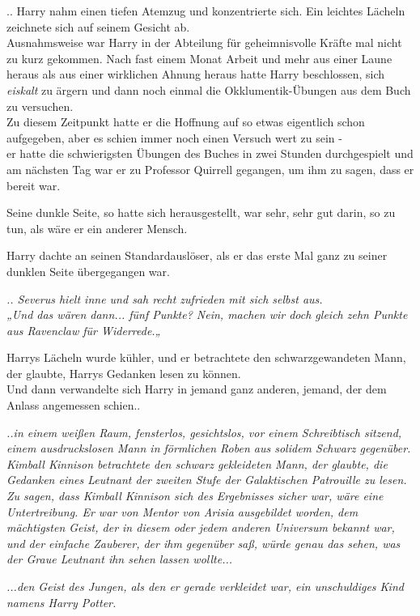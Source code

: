{.. Harry nahm einen tiefen Atemzug und konzentrierte sich. Ein leichtes Lächeln zeichnete sich auf seinem Gesicht ab.\\ Ausnahmsweise war Harry in der Abteilung für geheimnisvolle Kräfte mal nicht zu kurz gekommen. Nach fast einem Monat Arbeit und mehr aus einer Laune heraus als aus einer wirklichen Ahnung heraus hatte Harry beschlossen, sich \emph{eiskalt} zu ärgern und dann noch einmal die Okklumentik-Übungen aus dem Buch zu versuchen.\\ Zu diesem Zeitpunkt hatte er die Hoffnung auf so etwas eigentlich schon aufgegeben, aber es schien immer noch einen Versuch wert zu sein -\\ er hatte die schwierigsten Übungen des Buches in zwei Stunden durchgespielt und am nächsten Tag war er zu Professor Quirrell gegangen, um ihm zu sagen, dass er bereit war.

Seine dunkle Seite, so hatte sich herausgestellt, war sehr, sehr gut darin, so zu tun, als wäre er ein anderer Mensch.

Harry dachte an seinen Standardauslöser, als er das erste Mal ganz zu seiner dunklen Seite übergegangen war.

\emph{.. Severus hielt inne und sah recht zufrieden mit sich selbst aus.\\ „Und das wären dann... fünf Punkte? Nein, machen wir doch gleich zehn Punkte aus Ravenclaw für Widerrede.„}

Harrys Lächeln wurde kühler, und er betrachtete den schwarzgewandeten Mann, der glaubte, Harrys Gedanken lesen zu können.\\ Und dann verwandelte sich Harry in jemand ganz anderen, jemand, der dem Anlass angemessen schien..

\emph{..in einem weißen Raum, fensterlos, gesichtslos, vor einem Schreibtisch sitzend, einem ausdruckslosen Mann in förmlichen Roben aus solidem Schwarz gegenüber.\\ Kimball Kinnison betrachtete den schwarz gekleideten Mann, der glaubte, die Gedanken eines Leutnant der zweiten Stufe der Galaktischen Patrouille zu lesen.\\ Zu sagen, dass Kimball Kinnison sich des Ergebnisses sicher war, wäre eine Untertreibung. Er war von Mentor von Arisia ausgebildet worden, dem mächtigsten Geist, der in diesem oder jedem anderen Universum bekannt war, und der einfache Zauberer, der ihm gegenüber saß, würde genau das sehen, was der Graue Leutnant ihn sehen lassen wollte...}

\emph{...den Geist des Jungen, als den er gerade verkleidet war, ein unschuldiges Kind namens Harry Potter.}

}
